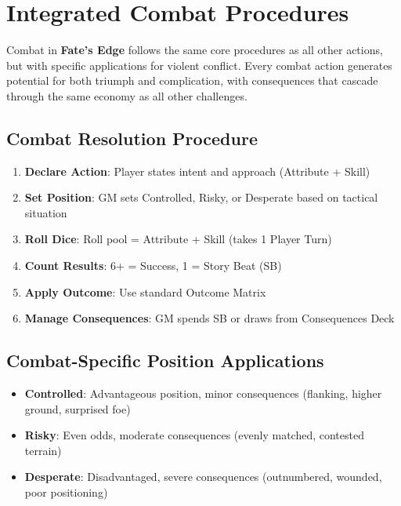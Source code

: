 \section{Integrated Combat Procedures}

Combat in \textbf{Fate's Edge} follows the same core procedures as all other actions, but with specific applications for violent conflict. Every combat action generates potential for both triumph and complication, with consequences that cascade through the same economy as all other challenges.

\subsection{Combat Resolution Procedure}

\begin{enumerate}
    \item \textbf{Declare Action}: Player states intent and approach (Attribute + Skill)
    \item \textbf{Set Position}: GM sets Controlled, Risky, or Desperate based on tactical situation
    \item \textbf{Roll Dice}: Roll pool = Attribute + Skill (takes 1 Player Turn)
    \item \textbf{Count Results}: 6+ = Success, 1 = Story Beat (SB)
    \item \textbf{Apply Outcome}: Use standard Outcome Matrix
    \item \textbf{Manage Consequences}: GM spends SB or draws from Consequences Deck
\end{enumerate}

\subsection{Combat-Specific Position Applications}

\begin{itemize}
    \item \textbf{Controlled}: Advantageous position, minor consequences (flanking, higher ground, surprised foe)
    \item \textbf{Risky}: Even odds, moderate consequences (evenly matched, contested terrain)
    \item \textbf{Desperate}: Disadvantaged, severe consequences (outnumbered, wounded, poor positioning)
\end{itemize}

